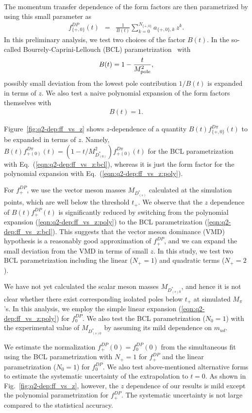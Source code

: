 \documentclass{PoS}
\newcommand{\bea}{\begin{eqnarray}}
\newcommand{\eea}{\end{eqnarray}}
\newcommand{\fpzDP}{{f_{\{+,0\}}^{DP}}}
\newcommand{\fpDP}{{f_+^{DP}}}
\newcommand{\fzDP}{{f_0^{DP}}}
\newcommand{\fpzDpi}{{f_{\{+,0\}}^{D\pi}}}
\begin{document}

The momentum transfer dependence of the form factors are then
parametrized by using this small parameter as 
\bea
   \fpzDP(t)
   & = &
   \frac{1}{B(t)} \sum_{k=0}^{N_{\{+,0\}}} a_{\{+,0\},k}\, z^k.
   \label{eqn:q2-dep:ff_vs_z}
\eea
In this preliminary analysis,
we test two choices of the factor $B(t)$. 
In the so-called Bourrely-Caprini-Lellouch (BCL) parametrization~\cite{BCL}
with 
\bea
   B(t) = 1 - \frac{t}{M_{\rm pole}^2},
   \label{eqn:q2-dep:ff_vs_z:bcl}
\eea   
possibly small deviation from the lowest pole contribution $1/B(t)$
is expanded in terms of $z$.
We also test a naive polynomial expansion of the form factors themselves
with 
\bea
   B(t) = 1.
   \label{eqn:q2-dep:ff_vs_z:poly}
\eea



Figure~\ref{fig:q2-dep:ff_vs_z} shows 
$z$-dependence of a quantity $B(t)\fpzDpi(t)$ to be expanded in terms of $z$.
Namely, $B(t)f_{+(0)}^{D\pi}(t)\!=\!(1-t/M_{D^*_{(0)}}^2) f_{+(0)}^{D\pi}(t)$ 
for the BCL parametrization with Eq.~(\ref{eqn:q2-dep:ff_vs_z:bcl}),
whereas it is just the form factor for the polynomial expansion 
with Eq.~(\ref{eqn:q2-dep:ff_vs_z:poly}).



For $\fpDP$, 
we use the vector meson masses $M_{D_{(s)}^*}$ calculated at the simulation points,
which are well below the threshold $t_+$. 
We observe that the $z$ dependence of $B(t)\fpDP(t)$ is significantly reduced
by switching from the polynomial expansion (\ref{eqn:q2-dep:ff_vs_z:poly})
to the BCL parametrization (\ref{eqn:q2-dep:ff_vs_z:bcl}).
This suggests that the vector meson dominance (VMD) hypothesis is
a reasonably good approximation of $\fpDP$,
and we can expand the small deviation from the VMD
in terms of small $z$.
In this study, we test
two BCL parametrization
including the linear ($N_+\!=\!1$) and quadratic terms ($N_+\!=\!2$).



We have not yet calculated the scalar meson masses $M_{D_{(s)0}^*}$,
and hence it is not clear whether there exist
corresponding isolated poles below $t_+$ at simulated $M_\pi$'s.
In this analysis,
we employ the simple linear expansion (\ref{eqn:q2-dep:ff_vs_z:poly})
for $\fzDP$.
We also test 
the BCL parametrization ($N_0\!=\!1$) 
with the experimental value of $M_{D_{(s)0}^*}$
by assuming its mild dependence on $m_{ud}$.



We estimate the normalization $\fpDP(0)\!=\!\fzDP(0)$
from the simultaneous fit
using the BCL parametrization with $N_+\!=\!1$ for $\fpDP$
and the linear parametrization ($N_0\!=\!1$) for $\fzDP$.
We also test above-mentioned alternative forms
to estimate the systematic uncertainty of the extrapolation to $t\!=\!0$.
As shown in Fig.~\ref{fig:q2-dep:ff_vs_z}, however, 
the $z$ dependence of our results is mild 
except the polynomial parametrization for $\fpDP$. 
The systematic uncertainty is not large compared to
the statistical accuracy.
\end{document}
